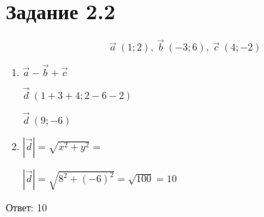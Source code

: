 \section*{Задание 2.2}

\[
\Vec{a}\ (1;2),\ \Vec{b}\ (-3;6),\ \Vec{c}\ (4;-2)
\]

\begin{enumerate}
    \item {
        $\Vec{a} - \Vec{b} + \Vec{c}$

        $\Vec{d}\ (1+3+4; 2-6-2)$

        $\Vec{d}\ (9; -6)$
    }
    
    \item {
        $|\Vec{d}| = \sqrt{x^2 + y^2} = $

        $|\Vec{d}| = \sqrt{8^2 + (-6)^2} = \sqrt{100} = 10$
    }
\end{enumerate}

Ответ: 10